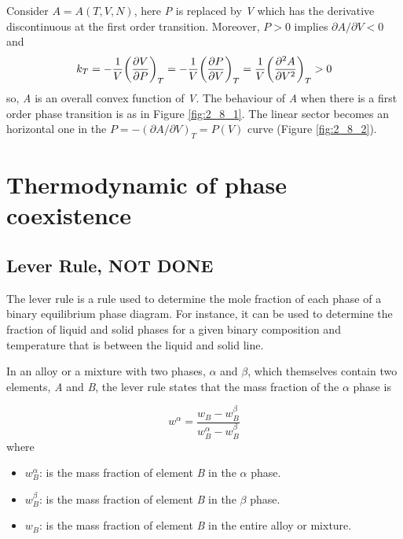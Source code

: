 \documentclass[../../Main/Main.tex]{subfiles}
\begin{document}
Consider \( A = A (T,V,N) \), here  \emph{P} is replaced by \emph{V} which has the derivative discontinuous at the first order transition. Moreover, \( P > 0 \)  implies \( \partial{A}/\partial{V} < 0   \) and
\begin{equation}
  k_T = -\frac{1}{V} \qty(\pdv{V}{P} )_T = -\frac{1}{V} \qty(\pdv{P}{V} )_T = \frac{1}{V} \qty(\pdv[2]{A}{V} )_T > 0
  \label{eq:}
\end{equation}
so, \emph{A} is an overall convex function of \emph{V}.
The behaviour of \emph{A} when there is a first order phase transition is as in Figure \ref{fig:2_8_1}. The linear sector becomes an horizontal one in the \( P = - (\partial{A}/\partial{V}  )_T = P (V) \) curve (Figure \ref{fig:2_8_2}).







\section{Thermodynamic of phase coexistence}

\subsection{Lever Rule, NOT DONE}

The lever rule is a rule used to determine the mole fraction of each phase of a binary equilibrium phase diagram. For instance, it can be used to determine the fraction of liquid and solid phases for a given binary composition and temperature that is between the liquid and solid line.

In an alloy or a mixture with two phases, \( \alpha  \)  and \( \beta  \), which themselves contain two elements, \emph{A}  and \emph{B}, the lever rule states that the mass fraction of the \( \alpha  \)  phase is

\begin{equation}
w^{\alpha } = \frac{w_B - w_B^\beta }{w_B^\alpha - w_B^\beta }
\end{equation}
where
\begin{itemize}
\item \( w_B^\alpha  \):  is the mass fraction of element \emph{B}  in the \( \alpha  \) phase.
\item \( w_B^\beta   \):  is the mass fraction of element \emph{B} in the \( \beta  \)  phase.
\item \( w_B  \):  is the mass fraction of element \emph{B} in the entire alloy or mixture.
\end{itemize}
\end{document}
